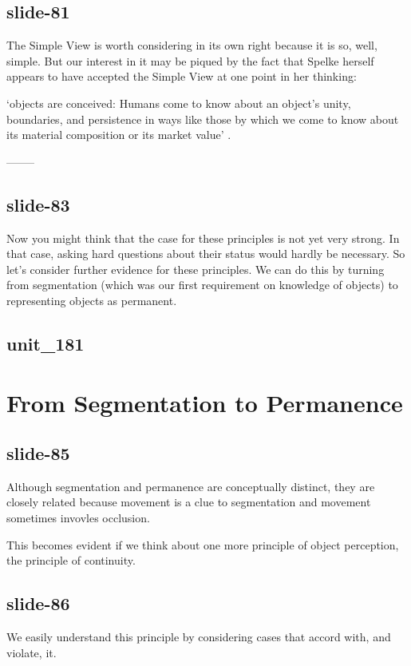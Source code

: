 \documentclass[12pt,\papersize]{extarticle}
\begin{document}
\subsection{slide-81}
The Simple View is worth considering in its own right because it is so, well, simple.
But our interest in it may be piqued by the fact that   
Spelke herself appears to have accepted the Simple View at one point in her thinking:
 
‘objects are conceived: Humans come to know about an object’s unity, boundaries, and 
persistence in ways like those by which we come to know about its material composition or its 
market value’
\citep[p.\ 198]{Spelke:1988xc}.
 
--------
\subsection{slide-83}
Now you might think that the case for these principles is not yet very strong.
In that case, asking hard questions about their status would hardly be necessary.
So let’s consider further evidence for these principles.
We can do this by turning from segmentation (which was our first requirement on knowledge of 
objects) 
to representing objects as permanent.
 
\subsection{unit\_181}
 
 
\section{From Segmentation to Permanence}
 
\subsection{slide-85}
Although segmentation and permanence are conceptually distinct, they are closely related 
            because movement is a clue to segmentation and movement sometimes invovles occlusion.
 
This becomes evident if we think about one more principle of object perception, the principle of continuity.
 
\subsection{slide-86}
We easily understand this principle by considering cases that accord with, and violate, it.
 
\end{document}
